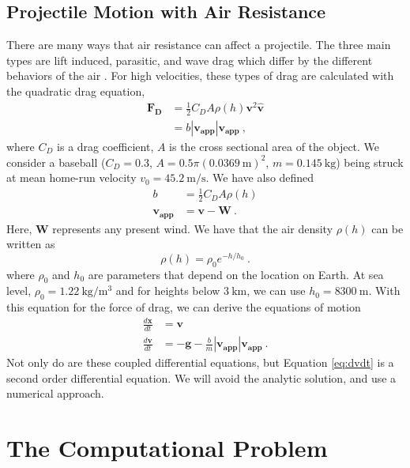 \documentclass[aps,prl,twocolumn,superscriptaddress]{revtex4-1}
\newcommand{\cmod}[1]{\left| #1 \right|}	%
\begin{document}
\subsection{Projectile Motion with Air Resistance}
There are many ways that air resistance can affect a projectile. The three main types are lift induced, parasitic, and wave drag which differ by the different behaviors of the air \cite{drag}. For high velocities, these types of drag are calculated with the quadratic drag equation,
\begin{align}
\bm{F_D} &= \frac{1}{2}C_DA\rho(h)\bm{v}^2\bm{\hat{v}} \label{eq:drag} \\
&= b\cmod{\bm{v_{\text{app}}}}\bm{v_{\text{app}}} ~, \label{eq:drag2} 
\end{align}
where $C_D$ is a drag coefficient, $A$ is the cross sectional area of the object. We consider a baseball ($C_D = 0.3$, $A = 0.5 \pi (\SI{0.0369}{\m})^2$, $m = \SI{0.145}{\kg}$) being struck at mean home-run velocity $v_0 = \SI{45.2}{\m\per\s}$. We have also defined
\begin{align}
b &= \frac{1}{2}C_DA\rho(h) \label{eq:b} \\
\bm{v_{\text{app}}} &= \bm{v} - \bm{W} ~. \label{eq:vapp}
\end{align}
Here, $\bm{W}$ represents any present wind. We have that the air density $\rho(h)$ can be written as \cite{Laulima}
\begin{equation}
\rho(h) = \rho_0 e^{-h/h_0} ~. \label{eq:rho}
\end{equation}
where $\rho_0$ and $h_0$ are parameters that depend on the location on Earth. At sea level, $\rho_0 = \SI{1.22}{\kg\per\m\cubed}$ and for heights below $\SI{3}{\km}$, we can use $h_0 = \SI{8300}{\m}$. With this equation for the force of drag, we can derive the equations of motion
\begin{align}
\frac{d\bm{x}}{dt} &= \bm{v} \label{eq:dxdt} \\
\frac{d\bm{v}}{dt} &= -\bm{g} - \frac{b}{m}\cmod{\bm{v_{\text{app}}}}\bm{v_{\text{app}}} ~. \label{eq:dvdt}
\end{align}
Not only do are these coupled differential equations, but Equation \ref{eq:dvdt} is a second order differential equation. We will avoid the analytic solution, and use a numerical approach.

\section{The Computational Problem}
\end{document}

